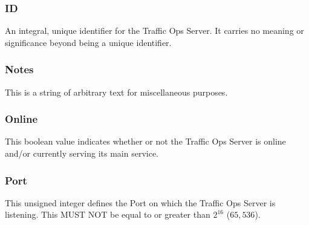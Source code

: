 \subsubsection{ID}
An integral, unique identifier for the Traffic Ops Server. It carries no meaning
or significance beyond being a unique identifier.

\subsubsection{Notes}
This is a string of arbitrary text for miscellaneous purposes.

\subsubsection{Online}
This boolean value indicates whether or not the Traffic Ops Server is online
and/or currently serving its main service.

\subsubsection{Port}
This unsigned integer defines the Port on which the Traffic Ops Server is
listening. This MUST NOT be equal to or greater than $2^{16}$ ($65,536$).
